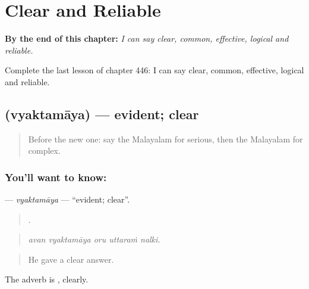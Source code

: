 
\chapter{Clear and Reliable}
\label{ch:ml-clear-and-reliable}

\begin{chapteropening}
\textbf{By the end of this chapter:} \emph{I can say clear, common, effective, logical and reliable.}

Complete the last lesson of chapter 446: I can say clear, common, effective, logical and reliable.
\end{chapteropening}

\section[\texorpdfstring{\ml{വ്യക്തമായ} (vyaktamāya)}{വ്യക്തമായ (vyaktamāya)}]{ (vyaktamāya) — evident; clear}

\label{lesson:ML-C446-vyaktamaya}



\begin{quote}
Before the new one: say the Malayalam for serious, then the Malayalam for complex.
\end{quote}

\subsection*{You'll want to know: }
\textbf{} — \emph{vyaktamāya} — \textquotedblleft{}evident; clear\textquotedblright{}.

\begin{quote}
    .
\end{quote}

\begin{quote}
\emph{avan vyaktamāya oru uttaraṁ nalki.}
\end{quote}

\begin{quote}
He gave a clear answer.
\end{quote}

The adverb is , clearly.

